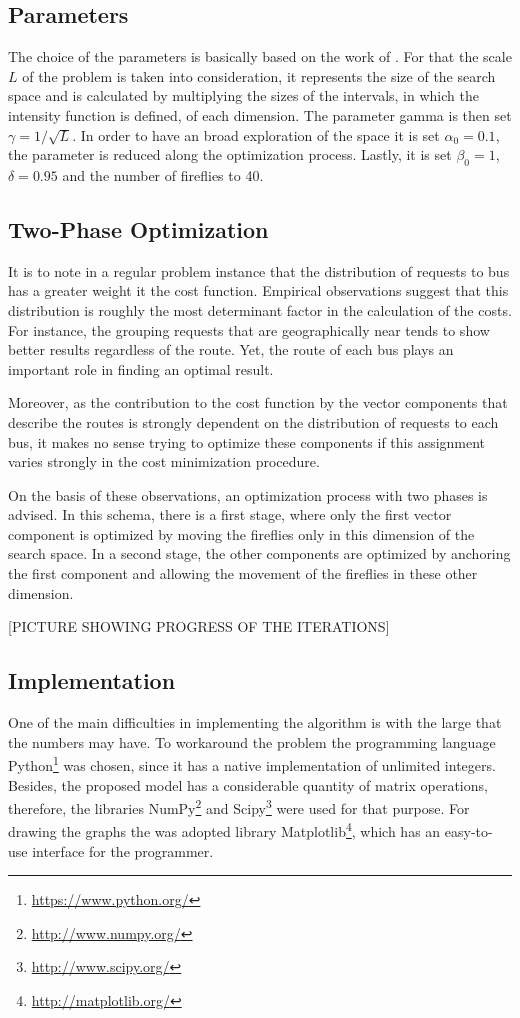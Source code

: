 \documentclass[tuberlin,cic,tc,openright,english,noabntcite,oneside]{iiufrgs}
\begin{document}
\subsection{Parameters}
The choice of the parameters is basically based on the work of \textcite[p. 37-38]{yang_firefly_2013}. For that the scale $L$ of the problem is taken into consideration, it represents the size of the search space and is calculated by multiplying the sizes of the intervals, in which the intensity function is defined, of each dimension. The parameter gamma is then set $\gamma = 1/\sqrt{L}$. In order to have an broad exploration of the space it is set $\alpha_0 = 0.1$, the parameter is reduced along the optimization process. Lastly, it is set $\beta_0 = 1$, $\delta = 0.95$ and the number of fireflies to 40.

\subsection{Two-Phase Optimization}
It is to note in a regular problem instance that the distribution of requests to bus has a greater weight it the cost function. Empirical observations suggest that this distribution is roughly the most determinant factor in the calculation of the costs. For instance, the grouping requests that are geographically near tends to show better results regardless of the route. Yet, the route of each bus plays an important role in finding an optimal result.

Moreover, as the contribution to the cost function by the vector components that describe the routes is strongly dependent on the distribution of requests to each bus, it makes no sense trying to optimize these components if this assignment varies strongly in the cost minimization procedure.

On the basis of these observations, an optimization process with two phases is advised. In this schema, there is a first stage, where only the first vector component is optimized by moving the fireflies only in this dimension of the search space. In a second stage, the other components are optimized by anchoring the first component and allowing the movement of the fireflies in these other dimension.

[PICTURE SHOWING PROGRESS OF THE ITERATIONS]

\subsection{Implementation}
One of the main difficulties in implementing the algorithm is with the large that the numbers may have. To workaround the problem the programming language Python\footnote{\url{https://www.python.org/}} was chosen, since it has a native implementation of unlimited integers. Besides, the proposed model has a considerable quantity of matrix operations, therefore, the libraries NumPy\footnote{\url{http://www.numpy.org/}} and Scipy\footnote{\url{http://www.scipy.org/}} were used for that purpose. For drawing the graphs the was adopted library Matplotlib\footnote{\url{http://matplotlib.org/}}, which has an easy-to-use interface for the programmer.
\end{document}

